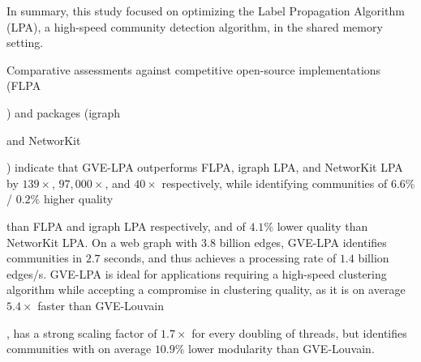In summary, this study focused on optimizing the Label Propagation Algorithm (LPA), a high-speed community detection algorithm, in the shared memory setting. Comparative assessments against competitive open-source implementations (FLPA) and packages (igraph and NetworKit) indicate that GVE-LPA outperforms FLPA, igraph LPA, and NetworKit LPA by $139\times$, $97,000\times$, and $40\times$ respectively, while identifying communities of $6.6\%$ / $0.2\%$ higher quality than FLPA and igraph LPA respectively, and of $4.1\%$ lower quality than NetworKit LPA. On a web graph with $3.8$ billion edges, GVE-LPA identifies communities in $2.7$ seconds, and thus achieves a processing rate of $1.4$ billion edges/s. GVE-LPA is ideal for applications requiring a high-speed clustering algorithm while accepting a compromise in clustering quality, as it is on average $5.4\times$ faster than GVE-Louvain, has a strong scaling factor of $1.7\times$ for every doubling of threads, but identifies communities with on average $10.9\%$ lower modularity than GVE-Louvain.
